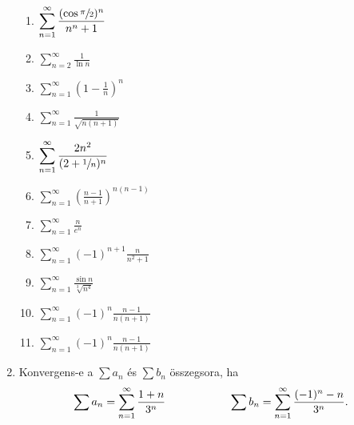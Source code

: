 \documentclass[a4paper, 12pt]{scrartcl}
\begin{document}
\begin{enumerate}
\begin{multicols}{3}
\begin{enumerate}
            \item $\displaystyle
                    \sum_{n = 1}^\infty \frac{(\cos \sfrac{\pi}{2})^n}{n^n + 1}
                  $

            \item $\displaystyle
                    \sum_{n = 2}^\infty \frac{1}{\ln n}
                  $

            \item $\displaystyle
                    \sum_{n = 1}^\infty \left( 1 - \frac1n \right)^n
                  $

            \item $\displaystyle
                    \sum_{n = 1}^\infty \frac{1}{\sqrt{n(n+1)}}
                  $

            \item $\displaystyle
                    \sum_{n = 1}^\infty \frac{2n^2}{(2 + \sfrac{1}{n})^n}
                  $

            \item $\displaystyle
                    \sum_{n = 1}^\infty \left(
                    \frac{n - 1}{n +1}
                    \right)^{n(n - 1)}
                  $

            \item $\displaystyle
                    \sum_{n = 1}^\infty \frac{n}{e^n}
                  $

            \item $\displaystyle
                    \sum_{n = 1}^\infty (-1)^{n + 1} \frac{n}{n^2 + 1}
                  $

            \item $\displaystyle
                    \sum_{n = 1}^\infty \frac{\sin n}{\sqrt[3]{n^4}}
                  $

            \item $\displaystyle
                    \sum_{n = 1}^\infty (-1)^n \frac{n - 1}{n(n + 1)}
                  $

            \item $\displaystyle
                    \sum_{n = 1}^\infty (-1)^n \frac{n - 1}{n(n + 1)}
                  $
          \end{enumerate}
        \end{multicols}

  \item Konvergens-e a $\sum a_n$ és $\sum b_n$ összegsora, ha
        \[
          \sum a_n = \sum_{n = 1}^\infty \frac{1+n}{3^n}
          \hspace{2cm}
          \sum b_n = \sum_{n = 1}^\infty \frac{(-1)^n - n}{3^n}
          \text.
        \]


\end{enumerate}
\end{document}
